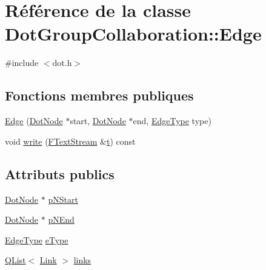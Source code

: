 \hypertarget{class_dot_group_collaboration_1_1_edge}{}\section{Référence de la classe Dot\+Group\+Collaboration\+:\+:Edge}
\label{class_dot_group_collaboration_1_1_edge}


{\ttfamily \#include $<$dot.\+h$>$}

\subsection*{Fonctions membres publiques}
\begin{DoxyCompactItemize}
\item 
\hyperlink{class_dot_group_collaboration_1_1_edge_a72ac56ac966b6ab1f983c728e99f9608}{Edge} (\hyperlink{class_dot_node}{Dot\+Node} $\ast$start, \hyperlink{class_dot_node}{Dot\+Node} $\ast$end, \hyperlink{class_dot_group_collaboration_ab83aa11b8617398a50923c04c2541624}{Edge\+Type} type)
\item 
void \hyperlink{class_dot_group_collaboration_1_1_edge_a1cb5153f62d179c3e0471955e69e3692}{write} (\hyperlink{class_f_text_stream}{F\+Text\+Stream} \&\hyperlink{058__bracket__recursion_8tcl_a69e959f6901827e4d8271aeaa5fba0fc}{t}) const 
\end{DoxyCompactItemize}
\subsection*{Attributs publics}
\begin{DoxyCompactItemize}
\item 
\hyperlink{class_dot_node}{Dot\+Node} $\ast$ \hyperlink{class_dot_group_collaboration_1_1_edge_a05c8193b7ab3fa66b1cfe1c7bd87e1d2}{p\+N\+Start}
\item 
\hyperlink{class_dot_node}{Dot\+Node} $\ast$ \hyperlink{class_dot_group_collaboration_1_1_edge_aaa1b8e53e4a95e63acde11b161331e11}{p\+N\+End}
\item 
\hyperlink{class_dot_group_collaboration_ab83aa11b8617398a50923c04c2541624}{Edge\+Type} \hyperlink{class_dot_group_collaboration_1_1_edge_a76a2ba25cd605e65eece591f41706626}{e\+Type}
\item 
\hyperlink{class_q_list}{Q\+List}$<$ \hyperlink{class_dot_group_collaboration_1_1_link}{Link} $>$ \hyperlink{class_dot_group_collaboration_1_1_edge_af8c82f23e5a2e9f3845fa402864eb6dd}{links}
\end{DoxyCompactItemize}


